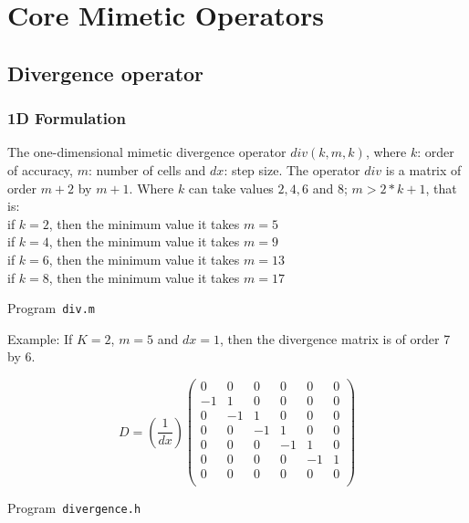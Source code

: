 \chapter{Core Mimetic Operators}

\section{Divergence operator}

\subsection{1D Formulation}
The one-dimensional mimetic divergence operator $div(k,m,k)$, where $k$: order of accuracy, $m$: number of cells and $dx$: step size. The operator $div$ is a matrix of order $m+2$ by $m+1$. Where $k$ can take values $​​2, 4, 6$ and $8$; $m > 2*k+1$, that is:\\

if $k=2$, then the minimum value it takes $m=5$\\
if $k=4$, then the minimum value it takes $m=9$\\
if $k=6$, then the minimum value it takes $m=13$\\
if $k=8$, then the minimum value it takes $m=17$\\
\begin{listing}[ht!]
	\tiny
	\centering
	\caption{Program~\texttt{div.m}}
	\label{code:div.m}
\end{listing}


Example: If  $K=2$, $m=5$ and $dx=1$, then the divergence matrix is ​​of order 7 by 6.

\begin{equation}
	D= (\frac{1}{dx})\begin{pmatrix}
		0  & 0  & 0  & 0  & 0  & 0 \\
		-1 & 1  & 0  & 0  & 0  & 0 \\
		0  & -1 & 1  & 0  & 0  & 0 \\
		0  & 0  & -1 & 1  & 0  & 0 \\
		0  & 0  & 0  & -1 & 1  & 0 \\
		0  & 0  & 0  & 0  & -1 & 1 \\
		0  & 0  & 0  & 0  & 0  & 0 \\
	\end{pmatrix}
\end{equation}

\begin{listing}[ht!]
	\tiny
	\centering
	\caption{Program~\texttt{divergence.h}}
	\label{code:divergence.h}
\end{listing}

